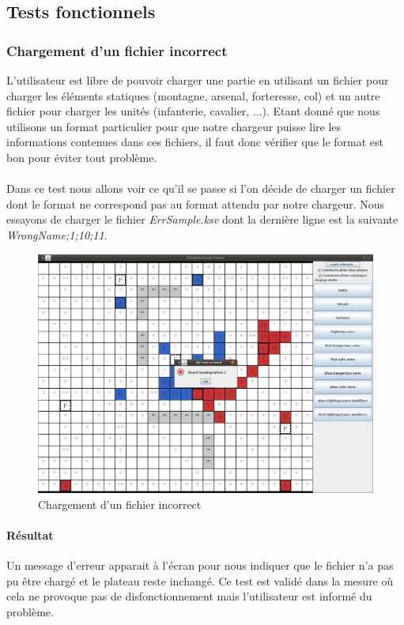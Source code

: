 				
		\subsection{Tests fonctionnels}
		
			\subsubsection{Chargement d'un fichier incorrect}
				L'utilisateur est libre de pouvoir charger une partie en utilisant un fichier pour charger les éléments statiques (montagne, arsenal, forteresse, col) et un autre fichier pour charger les unités (infanterie, cavalier, ...). Etant donné que nous utilisons un format particulier pour que notre chargeur puisse lire les informations contenues dans ces fichiers, il faut donc vérifier que le format est bon pour éviter tout problème.
				\\ \\
				Dans ce test nous allons voir ce qu'il se passe si l'on décide de charger un fichier dont le format ne correspond pas au format attendu par notre chargeur.
				Nous essayons de charger le fichier {\itshape ErrSample.ksv} dont la dernière ligne est la suivante {\itshape WrongName;1;10;11}. 

				\begin{figure}[!h]
				    \caption{Chargement d'un fichier incorrect}
				    \centering
				    \centerline{\includegraphics[scale=0.35]{images/tests_fonctionnels/incorrect_file.png}}
				\end{figure}

				\paragraph{Résultat\\}
					Un message d'erreur apparait à l'écran pour nous indiquer que le fichier n'a pas pu être chargé et le plateau reste inchangé.
					Ce test est validé dans la mesure où cela ne provoque pas de disfonctionnement mais l'utilisateur est informé du problème.

